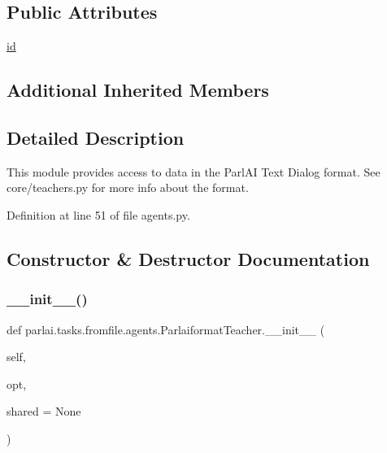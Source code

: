 \subsection*{Public Attributes}
\begin{DoxyCompactItemize}
\item 
\hyperlink{classparlai_1_1tasks_1_1fromfile_1_1agents_1_1ParlaiformatTeacher_af21d1457ab02cd0d2d0583d1c543004f}{id}
\end{DoxyCompactItemize}
\subsection*{Additional Inherited Members}


\subsection{Detailed Description}
\begin{DoxyVerb}This module provides access to data in the ParlAI Text Dialog format.
See core/teachers.py for more info about the format.
\end{DoxyVerb}
 

Definition at line 51 of file agents.\+py.



\subsection{Constructor \& Destructor Documentation}
\mbox{\label{classparlai_1_1tasks_1_1fromfile_1_1agents_1_1ParlaiformatTeacher_a8d12f43b6359996764d176ba9a21189c}} 
\subsubsection{\texorpdfstring{\+\_\+\+\_\+init\+\_\+\+\_\+()}{\_\_init\_\_()}}
{\footnotesize\ttfamily def parlai.\+tasks.\+fromfile.\+agents.\+Parlaiformat\+Teacher.\+\_\+\+\_\+init\+\_\+\+\_\+ (\begin{DoxyParamCaption}\item[{}]{self,  }\item[{}]{opt,  }\item[{}]{shared = {\ttfamily None} }\end{DoxyParamCaption})}



